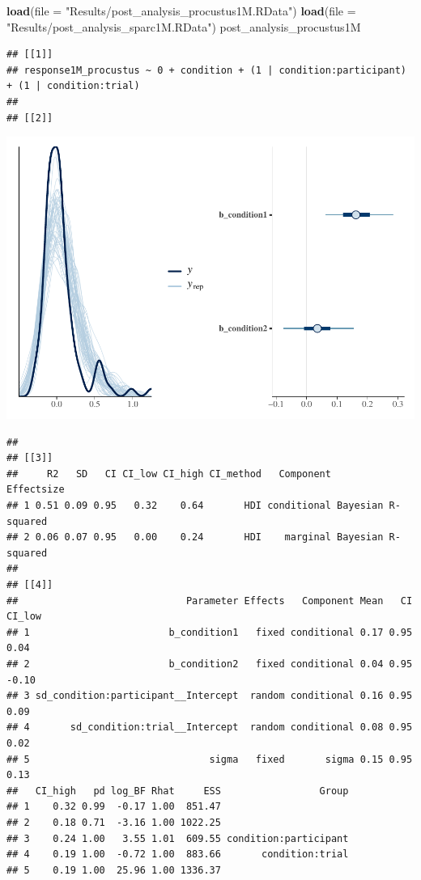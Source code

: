 \documentclass[
]{article}
\newenvironment{Shaded}{\begin{snugshade}}{\end{snugshade}}
\newcommand{\AttributeTok}[1]{\textcolor[rgb]{0.13,0.29,0.53}{#1}}
\newcommand{\FunctionTok}[1]{\textcolor[rgb]{0.13,0.29,0.53}{\textbf{#1}}}
\newcommand{\NormalTok}[1]{#1}
\newcommand{\StringTok}[1]{\textcolor[rgb]{0.31,0.60,0.02}{#1}}
\begin{document}
\begin{Shaded}
\begin{Highlighting}[]
\FunctionTok{load}\NormalTok{(}\AttributeTok{file =} \StringTok{"Results/post\_analysis\_procustus1M.RData"}\NormalTok{)}
\FunctionTok{load}\NormalTok{(}\AttributeTok{file =} \StringTok{"Results/post\_analysis\_sparc1M.RData"}\NormalTok{)}
\NormalTok{post\_analysis\_procustus1M}
\end{Highlighting}
\end{Shaded}

\begin{verbatim}
## [[1]]
## response1M_procustus ~ 0 + condition + (1 | condition:participant) + (1 | condition:trial) 
## 
## [[2]]
\end{verbatim}

\includegraphics{06_Publish_GUSO_ASIL_files/figure-latex/Diagnostiics1M-1.pdf}

\begin{verbatim}
## 
## [[3]]
##     R2   SD   CI CI_low CI_high CI_method   Component         Effectsize
## 1 0.51 0.09 0.95   0.32    0.64       HDI conditional Bayesian R-squared
## 2 0.06 0.07 0.95   0.00    0.24       HDI    marginal Bayesian R-squared
## 
## [[4]]
##                             Parameter Effects   Component Mean   CI CI_low
## 1                        b_condition1   fixed conditional 0.17 0.95   0.04
## 2                        b_condition2   fixed conditional 0.04 0.95  -0.10
## 3 sd_condition:participant__Intercept  random conditional 0.16 0.95   0.09
## 4       sd_condition:trial__Intercept  random conditional 0.08 0.95   0.02
## 5                               sigma   fixed       sigma 0.15 0.95   0.13
##   CI_high   pd log_BF Rhat     ESS                 Group
## 1    0.32 0.99  -0.17 1.00  851.47                      
## 2    0.18 0.71  -3.16 1.00 1022.25                      
## 3    0.24 1.00   3.55 1.01  609.55 condition:participant
## 4    0.19 1.00  -0.72 1.00  883.66       condition:trial
## 5    0.19 1.00  25.96 1.00 1336.37
\end{verbatim}
\end{document}
